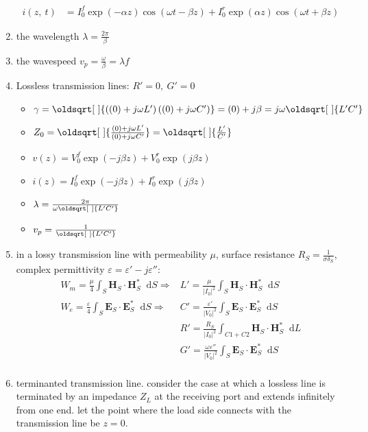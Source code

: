 \documentclass[a4paper,11pt]{article}
\renewcommand*{\sqrt}[2][\ ]{\oldsqrt[#1]{#2}}
\newcommand*\dd{\mathop{}\!\mathrm{d}}
\newcommand{\bvec}[1]{\mathbf{#1}}
\begin{document}
\begin{enumerate}
\begin{align*}
			i(z,~t) &= I_0^f\exp\left(-\alpha z\right)\cos\left(\omega t -\beta z\right) + I_0^r\exp\left(\alpha z\right)\cos\left(\omega t +\beta z\right)
		\end{align*}
		\item the wavelength $\lambda = \frac{2\pi}{\beta}$
		\item the wavespeed $v_p = \frac{\omega}{\beta} = \lambda f$
		\item Lossless transmission lines: $R' = 0,~G' = 0$
			\begin{itemize}
				\item $\gamma = \sqrt{\left((0) + j\omega L'\right)\left((0) + j\omega C'\right)} = (0) + j\beta = j\omega\sqrt{L'C'}$
				\item $Z_0 = \sqrt{\frac{(0) + j\omega L'}{(0) + j\omega C'}} = \sqrt{\frac{L'}{C'}}$
				\item $v(z) = V_0^f\exp\left(-j\beta z\right) + V_0^r\exp\left(j\beta z\right)$
				\item $i(z) = I_0^f\exp\left(-j\beta z\right) + I_0^r\exp\left(j\beta z\right)$
				\item $\lambda = \frac{2\pi}{\omega\sqrt{L'C'}}$
				\item $v_p = \frac{1}{\sqrt{L'C'}}$
			\end{itemize}
		\item in a lossy transmission line with permeability $\mu$, surface resistance $R_S = \frac{1}{\sigma\delta_S}$, complex permittivity $\varepsilon = \varepsilon' - j\varepsilon''$:
			\begin{align*}
				W_m = \frac{\mu}{4}\int_S \bvec{H}_S \cdot \bvec{H}_S^* \dd S \Longrightarrow &L' = \frac{\mu}{\left|I_0\right|^2}\int_S \bvec{H}_S \cdot \bvec{H}_S^* \dd S \\
				W_e = \frac{\varepsilon}{4}\int_S \bvec{E}_S \cdot \bvec{E}_S^* \dd S \Longrightarrow &C' = \frac{\varepsilon'}{\left|V_0\right|^2}\int_S \bvec{E}_S \cdot \bvec{E}_S^* \dd S  \\
				&R' = \frac{R_S}{\left|I_0\right|^2}\int_{C1 + C2} \bvec{H}_S \cdot \bvec{H}_S^* \dd L \\
				&G' = \frac{\omega\varepsilon''}{\left|V_0\right|^2}\int_{S} \bvec{E}_S \cdot \bvec{E}_S^* \dd S \\
			\end{align*}
		\item terminanted transmission line. consider the case at which a lossless line is terminated by an impedance $Z_L$ at the receiving port and extends infinitely from one end. let the point where the load side connects with the transmission line be $z = 0$.

\end{enumerate}
\end{document}
